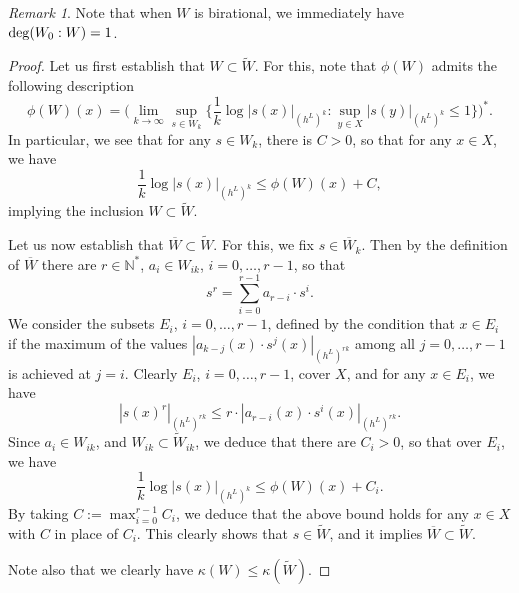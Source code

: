 \documentclass[12pt]{article}
\numberwithin{equation}{section}
\theoremstyle{theorem}
\theoremstyle{definition}
\theoremstyle{remark}
\newtheorem{rem}[thm]{Remark}
\newcommand{\nat}{\mathbb{N}}
\begin{document}
	\begin{rem}
		Note that when $W$ is birational, we immediately have ${\rm{deg}}(W_0 : W) = 1$.
	\end{rem}
	\begin{proof}
		Let us first establish that $W \subset \widetilde{W}$.
		For this, note that $\phi(W)$ admits the following description
		\begin{equation}
			\phi(W)(x)
			=
			\Big(
				\lim_{k \to \infty} \sup_{s \in W_k} \big\{
					\frac{1}{k} \log|s(x)|_{(h^L)^k} : 
					\sup_{y \in X} |s(y)|_{(h^L)^k} \leq 1
				\big\}
			\Big)^*.
		\end{equation}
		In particular, we see that for any $s \in W_k$, there is $C > 0$, so that for any $x \in X$, we have
		\begin{equation}
			\frac{1}{k} \log|s(x)|_{(h^L)^k}
			\leq 
			\phi(W)(x) + C,
		\end{equation}
		implying the inclusion $W \subset \widetilde{W}$.
		\par 
		Let us now establish that $\overline{W} \subset \widetilde{W}$.
		For this, we fix $s \in \overline{W}_k$.
		Then by the definition of $\overline{W}$ there are $r \in \nat^*$, $a_i \in W_{ik}$, $i = 0, \ldots, r - 1$, so that 
		\begin{equation}
			s^r = \sum_{i = 0}^{r - 1} a_{r - i} \cdot s^i.
		\end{equation}
		We consider the subsets $E_i$, $i = 0, \ldots, r - 1$, defined by the condition that $x \in E_i$ if the maximum of the values $|a_{k - j}(x) \cdot s^j(x)|_{(h^L)^{rk}}$ among all $j = 0, \ldots, r - 1$ is achieved at $j = i$.
		Clearly $E_i$, $i = 0, \ldots, r - 1$, cover $X$, and for any $x \in E_i$, we have
		\begin{equation}
			|s(x)^r|_{(h^L)^{rk}} \leq r \cdot |a_{r - i}(x) \cdot s^i(x)|_{(h^L)^{rk}}.
		\end{equation}
		Since $a_i \in W_{ik}$, and $W_{ik} \subset \widetilde{W}_{ik}$, we deduce that there are $C_i > 0$, so that over $E_i$, we have
		\begin{equation}
			\frac{1}{k} \log |s(x)|_{(h^L)^k}
			\leq
			\phi(W)(x) + C_i.
		\end{equation}
		By taking $C := \max_{i = 0}^{r - 1} C_i$, we deduce that the above bound holds for any $x \in X$ with $C$ in place of $C_i$.
		This clearly shows that $s \in \widetilde{W}$, and it implies $\overline{W} \subset \widetilde{W}$.
		\par 
		Note also that we clearly have $\kappa(W) \leq \kappa(\widetilde{W})$.

\end{proof}
\end{document}
